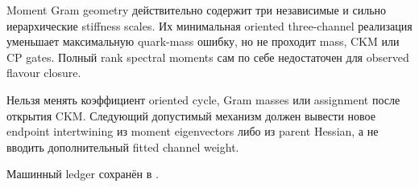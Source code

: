 \begin{theorem}
Moment Gram geometry действительно содержит три независимые и сильно
иерархические stiffness scales. Их минимальная oriented three-channel
реализация уменьшает максимальную quark-mass ошибку, но не проходит mass,
CKM или CP gates. Полный rank spectral moments сам по себе недостаточен для
observed flavour closure.
\end{theorem}

\begin{nogocriterion}
Нельзя менять коэффициент oriented cycle, Gram masses или assignment после
открытия CKM. Следующий допустимый механизм должен вывести новое endpoint
intertwining из moment eigenvectors либо из parent Hessian, а не вводить
дополнительный fitted channel weight.
\end{nogocriterion}

Машинный ledger сохранён в
.